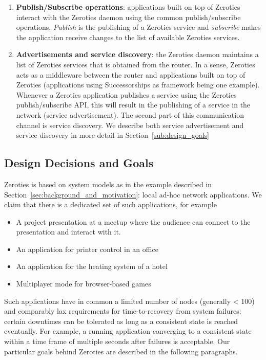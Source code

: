 \begin{enumerate}
\item \textbf{Publish/Subscribe operations}: applications built on top of Zeroties interact with the Zeroties daemon using the common publish/subscribe operations.
\textit{Publish} is the publishing of a Zeroties service and \textit{subscribe} makes the application receive changes to the list of available Zeroties services. 

\item \textbf{Advertisements and service discovery}: the Zeroties daemon maintains a list of Zeroties services that is obtained from the router.
In a sense, Zeroties acts as a middleware between the router and applications built on top of Zeroties (applications using Successorships as framework being one example). 
Whenever a Zeroties application publishes a service using the Zeroties publish/subscribe API, this will result in the publishing of a service in the network (service advertisement). 
The second part of this communication channel is service discovery.
We describe both service advertisement and service discovery in more detail in Section~\ref{sub:design_goals}
\end{enumerate}


\subsection{Design Decisions and Goals}
\label{sub:design}

Zeroties is based on system models as in the example described in Section~\ref{sec:background_and_motivation}: local ad-hoc network applications. We claim that there is a dedicated set of such applications, for example
\begin{itemize}
\item A project presentation at a meetup where the audience can connect to the presentation and interact with it.
\item An application for printer control in an office
\item An application for the heating system of a hotel
\item Multiplayer mode for browser-based games
\end{itemize}

Such applications have in common a limited number of nodes (generally < 100) and comparably lax requirements for time-to-recovery from system failures: certain downtimes can be tolerated as long as a consistent state is reached eventually.
For example, a running application converging to a consistent state within a time frame of multiple seconds after failures is acceptable.
Our particular goals behind Zeroties are described in the following paragraphs.

